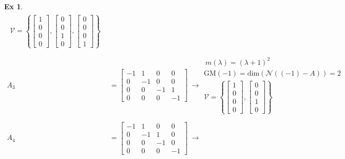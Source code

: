\documentclass[twoside]{article}
\newtheorem{exmp}[theorem]{Ex}
\begin{document}
\begin{exmp}
\begin{align*}
\begin{array}{c}
\mathcal{V} = \left\lbrace  \left[ \begin{array}{c} 1 \\ 0 \\ 0 \\ 0  \end{array} \right] ,   \left[ \begin{array}{c} 0  \\ 0 \\ 1 \\ 0   \end{array} \right] ,   \left[ \begin{array}{c} 0  \\ 0 \\ 0 \\ 1   \end{array} \right] \right\rbrace 
\end{array}
\\
\\
A_3 &=   \left[ \begin{array}{cccc} -1 & 1 & 0 & 0  \\ 0 & -1 & 0 & 0 \\ 0 & 0 & -1 & 1 \\ 0 & 0 & 0 & -1 \end{array} \right] \ \rightarrow  
\begin{array}{c} \ m(\lambda) = (\lambda + 1)^2 \\ \mathrm{GM}(-1) = \mathrm{dim}\left( \mathcal{N}((-1) - A) \right) = 2 
\\
\mathcal{V} = \left\lbrace  \left[ \begin{array}{c} 1 \\ 0 \\ 0 \\ 0  \end{array} \right] ,   \left[ \begin{array}{c} 0  \\ 0 \\ 1 \\ 0   \end{array} \right]  \right\rbrace 
\end{array}
\\
\\
A_4 &=   \left[ \begin{array}{cccc} -1 & 1 & 0 & 0  \\ 0 & -1 & 1 & 0 \\ 0 & 0 & -1 & 0 \\ 0 & 0 & 0 & -1 \end{array} \right] \ \rightarrow  

\end{align*}
\end{exmp}
\end{document}
